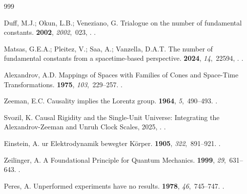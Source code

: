 \documentclass[entropy,article,submit,moreauthors,pdftex]{Definitions/mdpi}
\begin{document}
\begin{thebibliography}{999}

Duff, M.J.; Okun, L.B.; Veneziano, G.
\newblock Trialogue on the number of fundamental constants.
 {\bf 2002}, {\em 2002},~023,
  \href{http://arxiv.org/abs/arXiv:physics/0110060}{{}}.
.

Matsas, G.E.A.; Pleitez, V.; Saa, A.; Vanzella, D.A.T.
\newblock The number of fundamental constants from a spacetime-based
  perspective.
 {\bf 2024}, {\em 14},~22594,
  \href{http://arxiv.org/abs/arXiv:2311.09249}{{\normalfont
  [arXiv:2311.09249]}}.
.

Alexandrov, A.D.
\newblock Mappings of Spaces with Families of Cones and Space-Time
  Transformations.
 {\bf 1975}, {\em
  103},~229--257.
.

Zeeman, E.C.
\newblock Causality implies the {L}orentz group.
 {\bf 1964}, {\em 5},~490--493.
.

Svozil, K.
\newblock Causal Rigidity and the Single-Unit Universe: {I}ntegrating the
  {A}lexandrov-{Z}eeman and {U}nruh Clock Scales,  2025,
  \href{http://arxiv.org/abs/arXiv:2511.20728}{{\normalfont
  [arXiv:2511.20728]}}.
.

Einstein, A.
ur {E}lektrodynamik bewegter {K}{\"{o}}rper.
 {\bf 1905}, {\em 322},~891--921.
.

Zeilinger, A.
\newblock A Foundational Principle for Quantum Mechanics.
 {\bf 1999}, {\em 29},~631--643.
.

Peres, A.
\newblock Unperformed experiments have no results.
 {\bf 1978}, {\em 46},~745--747.
.


\end{thebibliography}
\end{document}
